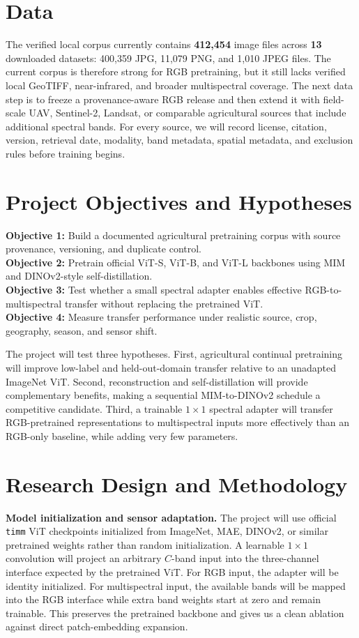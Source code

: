 \documentclass[10pt,twocolumn,letterpaper]{article}
\begin{document}
\section{Data}
The verified local corpus currently contains \textbf{412,454} image files across \textbf{13} downloaded datasets: 400,359 JPG, 11,079 PNG, and 1,010 JPEG files. The current corpus is therefore strong for RGB pretraining, but it still lacks verified local GeoTIFF, near-infrared, and broader multispectral coverage. The next data step is to freeze a provenance-aware RGB release and then extend it with field-scale UAV, Sentinel-2, Landsat, or comparable agricultural sources that include additional spectral bands. For every source, we will record license, citation, version, retrieval date, modality, band metadata, spatial metadata, and exclusion rules before training begins.

\section{Project Objectives and Hypotheses}
\textbf{Objective 1:} Build a documented agricultural pretraining corpus with source provenance, versioning, and duplicate control.\\
\textbf{Objective 2:} Pretrain official ViT-S, ViT-B, and ViT-L backbones using MIM and DINOv2-style self-distillation.\\
\textbf{Objective 3:} Test whether a small spectral adapter enables effective RGB-to-multispectral transfer without replacing the pretrained ViT.\\
\textbf{Objective 4:} Measure transfer performance under realistic source, crop, geography, season, and sensor shift.

The project will test three hypotheses. First, agricultural continual pretraining will improve low-label and held-out-domain transfer relative to an unadapted ImageNet ViT. Second, reconstruction and self-distillation will provide complementary benefits, making a sequential MIM-to-DINOv2 schedule a competitive candidate. Third, a trainable $1 \times 1$ spectral adapter will transfer RGB-pretrained representations to multispectral inputs more effectively than an RGB-only baseline, while adding very few parameters.

\section{Research Design and Methodology}
\textbf{Model initialization and sensor adaptation.} The project will use official \texttt{timm} ViT checkpoints initialized from ImageNet, MAE, DINOv2, or similar pretrained weights rather than random initialization. A learnable $1 \times 1$ convolution will project an arbitrary $C$-band input into the three-channel interface expected by the pretrained ViT. For RGB input, the adapter will be identity initialized. For multispectral input, the available bands will be mapped into the RGB interface while extra band weights start at zero and remain trainable. This preserves the pretrained backbone and gives us a clean ablation against direct patch-embedding expansion.
\end{document}
